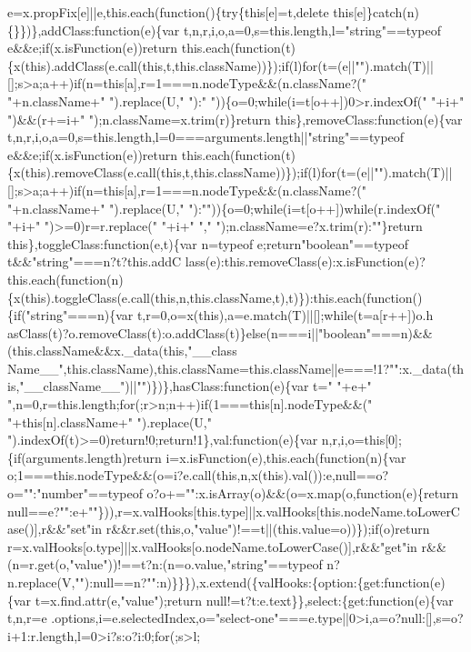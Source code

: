 \begin{DoxyCode}
{       e=x.propFix[e]||e,this.each(function()\{try\{this[e]=t,delete this[e]\}catch(n)\{\}\})\},addClass:function(e)\{var
       t,n,r,i,o,a=0,s=this.length,l="string"==typeof e&&e;if(x.isFunction(e))return
       this.each(function(t)\{x(this).addClass(e.call(this,t,this.className))\});if(l)for(t=(e||"").match(T)||[];s>a;a++)if(n=this[a],r=1===n.nodeType&&(n.className?(" "+n.className+"
       ").replace(U," "):" "))\{o=0;while(i=t[o++])0>r.indexOf(" "+i+" ")&&(r+=i+" ");n.className=x.trim(r)\}return
       this\},removeClass:function(e)\{var t,n,r,i,o,a=0,s=this.length,l=0===arguments.length||"string"==typeof
       e&&e;if(x.isFunction(e))return
       this.each(function(t)\{x(this).removeClass(e.call(this,t,this.className))\});if(l)for(t=(e||"").match(T)||[];s>a;a++)if(n=this[a],r=1===n.nodeType&&(n.className?(" "+n.className+" ").replace(U,"
       "):""))\{o=0;while(i=t[o++])while(r.indexOf(" "+i+" ")>=0)r=r.replace(" "+i+" ","
       ");n.className=e?x.trim(r):""\}return this\},toggleClass:function(e,t)\{var n=typeof e;return"boolean"==typeof
       t&&"string"===n?t?this.addC
      lass(e):this.removeClass(e):x.isFunction(e)?this.each(function(n)\{x(this).toggleClass(e.call(this,n,this.className,t),t)\}):this.each(function()\{if("string"===n)\{var
       t,r=0,o=x(this),a=e.match(T)||[];while(t=a[r++])o.h
      asClass(t)?o.removeClass(t):o.addClass(t)\}else(n===i||"boolean"===n)&&(this.className&&x.\_data(this,"\_\_class
      Name\_\_",this.className),this.className=this.className||e===!1?"":x.\_data(this,"\_\_className\_\_")||"")\})\},hasClass:function(e)\{var t=" "+e+" ",n=0,r=this.length;for(;r>n;n++)if(1===this[n].nodeType&&("
       "+this[n].className+" ").replace(U," ").indexOf(t)>=0)return!0;return!1\},val:function(e)\{var
       n,r,i,o=this[0];\{if(arguments.length)return i=x.isFunction(e),this.each(function(n)\{var
       o;1===this.nodeType&&(o=i?e.call(this,n,x(this).val()):e,null==o?o="":"number"==typeof o?o+="":x.isArray(o)&&(o=x.map(o,function(e)\{return
       null==e?"":e+""\})),r=x.valHooks[this.type]||x.valHooks[this.nodeName.toLowerCase()],r&&"set"in
       r&&r.set(this,o,"value")!==t||(this.value=o))\});if(o)return r=x.valHooks[o.type]||x.valHooks[o.nodeName.toLowerCase()],r&&"get"in
       r&&(n=r.get(o,"value"))!==t?n:(n=o.value,"string"==typeof
       n?n.replace(V,""):null==n?"":n)\}\}\}),x.extend(\{valHooks:\{option:\{get:function(e)\{var t=x.find.attr(e,"value");return null!=t?t:e.text\}\},select:\{get:function(e)\{var
       t,n,r=e
      .options,i=e.selectedIndex,o="select-one"===e.type||0>i,a=o?null:[],s=o?i+1:r.length,l=0>i?s:o?i:0;for(;s>l;
}
\end{DoxyCode}
